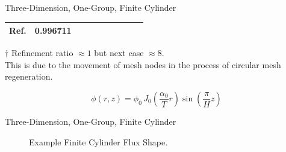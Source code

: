 \begin{frame}{Three-Dimension, One-Group, Finite Cylinder}
\begin{table}
\begin{center}
{\begin{threeparttable}
\begin{tabular}{cccccccccc}
        Ref. & 0.996711 \\
        \bottomrule
      \end{tabular}
        \begin{tablenotes}
        \item[$\dagger$] Refinement ratio $\approx 1$ but next case $\approx
          8$.\\
          This is due to the movement of mesh nodes in the process of circular
          mesh regeneration.
        \end{tablenotes}
      \end{threeparttable}
    }
    \end{center}
  \end{table}
  \vspace{-0.2in}
  \begin{figure}
    \centering
    \vspace{0.2in}
    \label{fig:circle_meshes}
  \end{figure}
  \vspace{-0.2in}
  \begin{equation}
    \label{eq:analytic_finite_cyl}
    \phi(r,z) = \phi_0 \, 
      J_0\left(\frac{\alpha_0}{T} r\right) \sin\left(\frac{\pi}{H} z \right)
  \end{equation}
\end{frame}

\begin{frame}{Three-Dimension, One-Group, Finite Cylinder}
  \begin{figure}
    \centering
    \hspace{0.2in}
    \caption{Example Finite Cylinder Flux Shape.}
    \label{fig:finite_cyl}
  \end{figure}
\end{frame}

